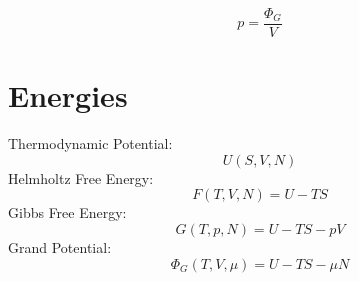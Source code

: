 \documentclass{article}
\begin{document}
\begin{equation}
	p=\frac{\Phi_G}{V}
\end{equation}

\section{Energies}

Thermodynamic Potential:
\begin{equation}
	U(S, V, N)
\end{equation}
%
Helmholtz Free Energy:
\begin{equation}
	F(T, V, N)=U-TS
\end{equation}
%
Gibbs Free Energy:
\begin{equation}
	G(T, p, N)=U-TS-pV
\end{equation}
%
Grand Potential:
\begin{equation}
	\Phi_G(T, V, \mu)=U-TS-\mu N
\end{equation}
\end{document}
